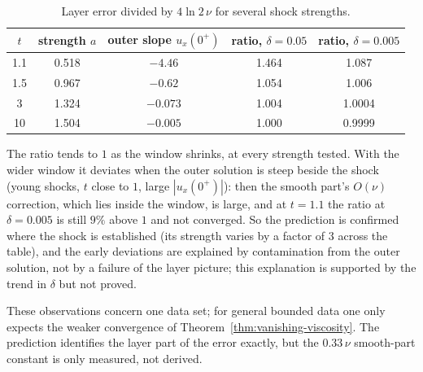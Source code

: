 \begin{table}[h]
\centering
\begin{tabular}{c c c c c}
  $t$ & strength $a$ & outer slope $u_x(0^+)$ & ratio, $\delta=0.05$ & ratio, $\delta=0.005$ \\\hline
  1.1  & 0.518 & $-4.46$  & 1.464 & 1.087 \\
  1.5  & 0.967 & $-0.62$  & 1.054 & 1.006 \\
  3    & 1.324 & $-0.073$ & 1.004 & 1.0004 \\
  10   & 1.504 & $-0.005$ & 1.000 & 0.9999
\end{tabular}
\caption{Layer error divided by $4\ln2\,\nu$ for several shock strengths.}
\label{tab:strength-independence}
\end{table}

The ratio tends to $1$ as the window shrinks, at every strength tested. With
the wider window it deviates when the outer solution is steep beside the
shock (young shocks, $t$ close to $1$, large $|u_x(0^+)|$): then the smooth
part's $O(\nu)$ correction, which lies inside the window, is large, and at
$t=1.1$ the ratio at $\delta=0.005$ is still $9\%$ above $1$ and not
converged. So the prediction is confirmed where the shock is established
(its strength varies by a factor of $3$ across the table), and the early
deviations are explained by contamination from the outer solution, not by a
failure of the layer picture; this explanation is supported by the trend in
$\delta$ but not proved.

\noindent These observations concern one data set; for general bounded data
one only expects the weaker convergence of
Theorem~\ref{thm:vanishing-viscosity}. The prediction identifies the
layer part of the error exactly, but the $0.33\,\nu$ smooth-part constant is
only measured, not derived.